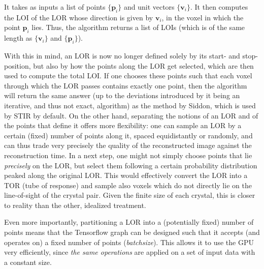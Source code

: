 \documentclass[a4paper, 11pt]{article}
\begin{document}
  It takes as inputs a list of points $\{\mathbf{p}_i\}$ and unit vectors $\{\mathbf{v}_i\}$. It then computes the LOI of the LOR whose direction is given by $\mathbf{v}_i$, in the voxel in which the point $\mathbf{p}_i$ lies. Thus, the algorithm returns a list of LOIs (which is of the same length as $\{\mathbf{v}_i\}$ and $\{\mathbf{p}_i\}$).

  With this in mind, an LOR is now no longer defined solely by its start- and stop-position, but also by how the points along the LOR get selected, which are then used to compute the total LOI. If one chooses these points such that each voxel through which the LOR passes contains exactly one point, then the algorithm will return the same answer (up to the deviations introduced by it being an iterative, and thus not exact, algorithm) as the method by Siddon, which is used by STIR by default. On the other hand, separating the notions of an LOR and of the points that define it offers more flexibility: one can sample an LOR by a certain (fixed) number of points along it, spaced equidistantly or randomly, and can thus trade very precisely the quality of the reconstructed image against the reconstruction time. In a next step, one might not simply choose points that lie \textsl{precisely} on the LOR, but select them following a certain probability distribution peaked along the original LOR. This would effectively convert the LOR into a TOR (tube of response) and sample also voxels which do not directly lie on the line-of-sight of the crystal pair. Given the finite size of each crystal, this is closer to reality than the other, idealized treatment.

  Even more importantly, partitioning a LOR into a (potentially fixed) number of points means that the Tensorflow graph can be designed such that it accepts (and operates on) a fixed number of points (\textsl{batchsize}). This allows it to use the GPU very efficiently, since \textsl{the same operations} are applied on a set of input data with a constant size.
\end{document}
